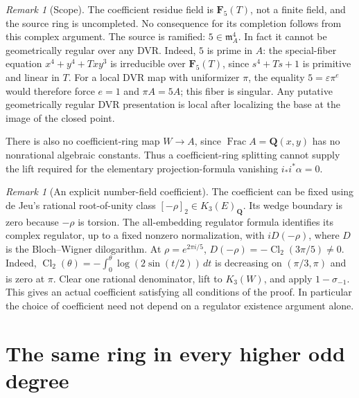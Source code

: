 \documentclass[11pt,a4paper]{article}
\theoremstyle{remark}
\newtheorem{remark}[theorem]{Remark}
\newcommand{\Q}{\mathbf Q}
\newcommand{\F}{\mathbf F}
\newcommand{\Frac}{\operatorname{Frac}}
\begin{document}
\begin{remark}[Scope]
The coefficient residue field is $\F_5(T)$, not a finite field, and
the source ring is uncompleted. No consequence for its completion
follows from this complex argument. The source is ramified:
$5\in\mathfrak m_A^4$. In fact it cannot be geometrically regular
over any DVR. Indeed, $5$ is prime in $A$: the special-fiber equation
$x^4+y^4+Txy^3$ is irreducible over $\F_5(T)$, since
$s^4+Ts+1$ is primitive and linear in $T$. For a local DVR map
with uniformizer $\pi$, the equality $5=\varepsilon\pi^e$ would
therefore force $e=1$ and $\pi A=5A$; this fiber is singular.
Any putative geometrically regular DVR presentation is local after
localizing the base at the image of the closed point.

There is also no coefficient-ring map $W\to A$, since
$\Frac A=\Q(x,y)$ has no nonrational algebraic constants. Thus a
coefficient-ring splitting cannot supply the lift required for the
elementary projection-formula vanishing $i_*i^*\alpha=0$.
\end{remark}

\begin{remark}[An explicit number-field coefficient]
The coefficient can be fixed using de Jeu's rational root-of-unity
class $[-\rho]_2\in K_3(E)_{\Q}$. Its wedge boundary is zero because
$-\rho$ is torsion. The all-embedding regulator formula
\cite[Theorem~2.3]{DeJeuCurves} identifies its complex regulator,
up to a fixed nonzero normalization, with $iD(-\rho)$, where $D$ is
the Bloch--Wigner dilogarithm. At $\rho=e^{2\pi i/5}$,
$D(-\rho)=-\operatorname{Cl}_2(3\pi/5)\ne0$.
Indeed, $\operatorname{Cl}_2(\theta)=
-\int_0^\theta\log(2\sin(t/2))\,dt$ is decreasing on
$(\pi/3,\pi)$ and is zero at $\pi$.
Clear one rational denominator, lift to $K_3(W)$, and apply
$1-\sigma_{-1}$. This gives an actual coefficient satisfying all
conditions of the proof. In particular the choice of coefficient
need not depend on a regulator existence argument alone.
\end{remark}

\section{The same ring in every higher odd degree}
\end{document}
